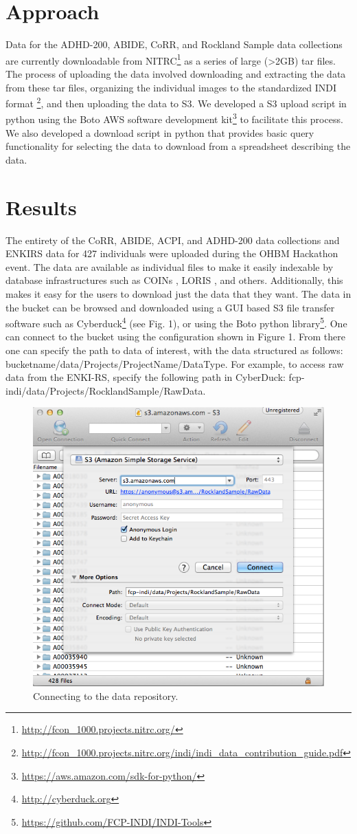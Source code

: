 \documentclass[twocolumn]{bmcart}%
\begin{document}
\section{Approach}\label{approach}

Data for the ADHD-200, ABIDE, CoRR, and Rockland Sample data collections
are currently downloadable from
NITRC\footnote{\url{http://fcon_1000.projects.nitrc.org/}} as a series
of large (\textgreater{}2GB) tar files. The process of uploading the
data involved downloading and extracting the data from these tar files,
organizing the individual images to the standardized INDI format
\footnote{\url{http://fcon_1000.projects.nitrc.org/indi/indi_data_contribution_guide.pdf}},
and then uploading the data to S3. We developed a S3 upload script in
python using the Boto AWS software development
kit\footnote{\url{https://aws.amazon.com/sdk-for-python/}} to facilitate
this process. We also developed a download script in python that
provides basic query functionality for selecting the data to download
from a spreadsheet describing the data.

\section{Results}\label{results}

The entirety of the CoRR, ABIDE, ACPI, and ADHD-200 data collections and
ENKIRS data for 427 individuals were uploaded during the OHBM Hackathon
event. The data are available as individual files to make it easily
indexable by database infrastructures such as COINs \cite{landis2016},
LORIS \cite{Das2011}, and others. Additionally, this makes it easy for
the users to download just the data that they want. The data in the
bucket can be browsed and downloaded using a GUI based S3 file transfer
software such as Cyberduck\footnote{\url{http://cyberduck.org}} (see
Fig. 1), or using the Boto python
library\footnote{\url{https://github.com/FCP-INDI/INDI-Tools}}. One can
connect to the bucket using the configuration shown in Figure 1. From
there one can specify the path to data of interest, with the data
structured as follows: bucketname/data/Projects/ProjectName/DataType.
For example, to access raw data from the ENKI-RS, specify the following
path in CyberDuck: fcp-indi/data/Projects/RocklandSample/RawData.

\begin{figure}[h!]
  \includegraphics[width=.47\textwidth]{cyberduck_screenshot.png}
  \caption{\label{centfig} Connecting to the data repository.}
\end{figure}
\end{document}
